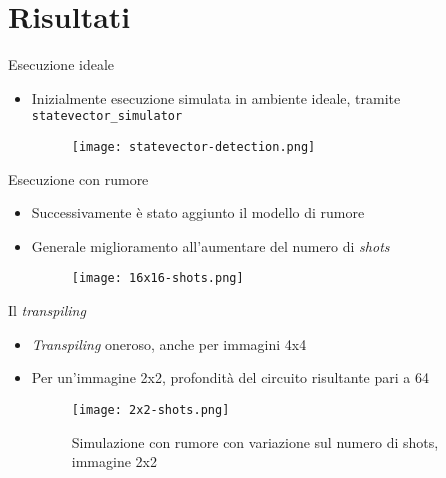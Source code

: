 \section{Risultati}


\begin{frame}{Esecuzione ideale}
	\begin{itemize}
		\item Inizialmente esecuzione simulata in ambiente ideale, tramite
		\texttt{statevector\_simulator}
		\begin{figure}
			\centering
			\texttt{[image: statevector-detection.png]}
		\end{figure}
	\end{itemize}
\end{frame}

\begin{frame}{Esecuzione con rumore}
	\begin{itemize}
		\item<1-> Successivamente è stato aggiunto il modello di rumore
		\item<2-> Generale miglioramento all'aumentare del numero di \emph{shots}
		\begin{figure}
			\centering
			\texttt{[image: 16x16-shots.png]}
		\end{figure}
	\end{itemize}
\end{frame}

\begin{frame}{Il \emph{transpiling}}
	\begin{itemize}
		\item \emph{Transpiling} oneroso, anche per immagini 4x4
		\item Per un'immagine 2x2, profondità del circuito risultante pari a 64
		\begin{figure}
			\centering
			\texttt{[image: 2x2-shots.png]}
			\caption{Simulazione con rumore con variazione sul numero di shots,
			immagine 2x2}
		\end{figure}
	\end{itemize}
\end{frame}

